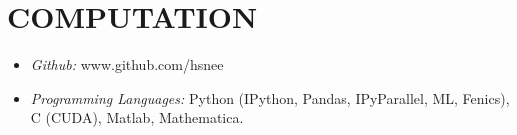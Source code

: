 \section{\textbf{\color{RoyalBlue}COMPUTATION}}

\begin{itemize} \item {\sl Github:} www.github.com/hsnee \\
\item {\sl Programming Languages:} Python (IPython, Pandas, IPyParallel, ML, Fenics), C (CUDA), Matlab, Mathematica. \\
\end{itemize}
